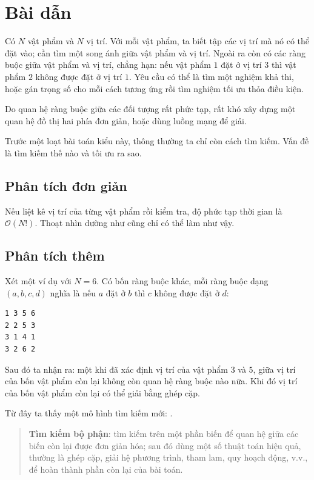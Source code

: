 \documentclass[11pt]{article}
\newcommand{\Oh}{\mathcal{O}}
\begin{document}
\section{Bài dẫn}

Có $N$ vật phẩm và $N$ vị trí. Với mỗi vật phẩm, ta biết tập các vị trí mà nó
có thể đặt vào; cần tìm một song ánh giữa vật phẩm và vị trí. Ngoài ra còn có
các ràng buộc giữa vật phẩm và vị trí, chẳng hạn: nếu vật phẩm $1$ đặt ở vị
trí $3$ thì vật phẩm $2$ không được đặt ở vị trí $1$. Yêu cầu có thể là tìm
một nghiệm khả thi, hoặc gán trọng số cho mỗi cách tương ứng rồi tìm nghiệm
tối ưu thỏa điều kiện.

Do quan hệ ràng buộc giữa các đối tượng rất phức tạp, rất khó xây dựng một
quan hệ đồ thị hai phía đơn giản, hoặc dùng luồng mạng để giải.

Trước một loạt bài toán kiểu này, thông thường ta chỉ còn cách tìm kiếm. Vấn
đề là tìm kiếm thế nào và tối ưu ra sao.

\subsection{Phân tích đơn giản}

Nếu liệt kê vị trí của từng vật phẩm rồi kiểm tra, độ phức tạp thời gian là
$\Oh(N!)$. Thoạt nhìn dường như cũng chỉ có thể làm như vậy.

\subsection{Phân tích thêm}

Xét một ví dụ với $N=6$. Có bốn ràng buộc khác, mỗi ràng buộc dạng
$(a,b,c,d)$ nghĩa là nếu $a$ đặt ở $b$ thì $c$ không được đặt ở $d$:
\begin{verbatim}
1 3 5 6
2 2 5 3
3 1 4 1
3 2 6 2
\end{verbatim}

Sau đó ta nhận ra: một khi đã xác định vị trí của vật phẩm $3$ và $5$, giữa vị
trí của bốn vật phẩm còn lại không còn quan hệ ràng buộc nào nữa. Khi đó vị
trí của bốn vật phẩm còn lại có thể giải bằng ghép cặp.

Từ đây ta thấy một mô hình tìm kiếm mới: .

\begin{quote}
\textbf{Tìm kiếm bộ phận}: tìm kiếm trên một phần biến để quan hệ giữa các
biến còn lại được đơn giản hóa; sau đó dùng một số thuật toán hiệu quả, thường
là ghép cặp, giải hệ phương trình, tham lam, quy hoạch động, v.v., để hoàn
thành phần còn lại của bài toán.
\end{quote}
\end{document}
